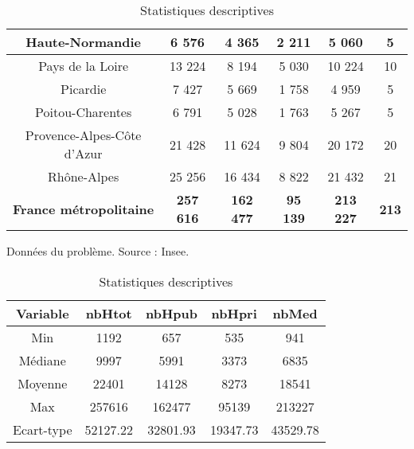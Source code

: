 \documentclass[a4paper,11pt]{article}
\begin{document}
\begin{table}[ht]
\begin{tabular}{|c||c|c|c||c|c|}
Haute-Normandie&6 576&4 365&2 211&5 060&5\\ \hline

Pays de la Loire&13 224&8 194&5 030&10 224&10\\ \hline

Picardie&7 427&5 669&1 758&4 959&5\\ \hline

Poitou-Charentes&6 791&5 028&1 763&5 267&5\\ \hline

Provence-Alpes-Côte d'Azur&21 428&11 624&9 804&20 172&20\\ \hline

Rhône-Alpes&25 256&16 434&8 822&21 432&21\\ \hline \hline

\textbf{France métropolitaine}&\textbf{257 616}&\textbf{162 477}&\textbf{95 139}&\textbf{213 227}&\textbf{213} \\
\hline 
\end{tabular} 
\caption{Données du problème. Source : Insee.}
%
%
\bigskip
\begin{center}
\begin{tabular}{|c||c|c|c|c|}
\hline 
Variable  & nbHtot &nbHpub  & nbHpri&  nbMed  \\ 
\hline \hline      
Min  &  1192  &   657  &  535  &   941    \\ 
\hline 
Médiane &  9997  &  5991  &  3373  &  6835  \\ 
\hline 
Moyenne  &  22401 & 14128 & 8273 &  18541  \\ 
\hline  
Max  & 257616 & 162477 & 95139 & 213227  \\ 
\hline 
Ecart-type &52127.22 & 32801.93 & 19347.73 & 43529.78 \\ 
\hline 
\end{tabular} 
\caption{Statistiques descriptives}
\end{center}
\end{table}
\end{document}

